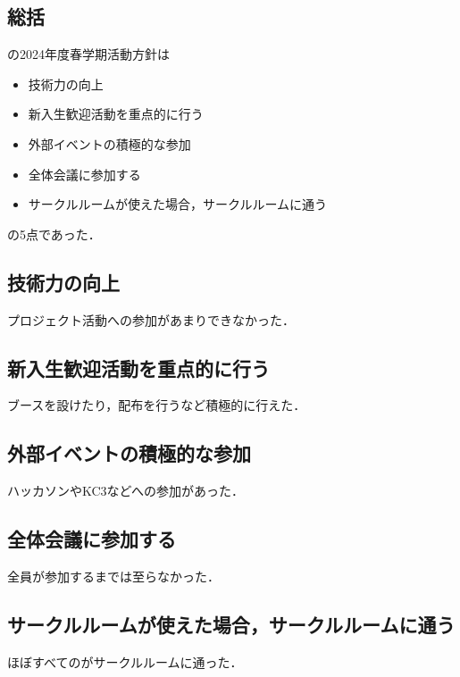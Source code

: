 \subsection*{\secondGrade{}総括}


\secondGrade{}の2024年度春学期活動方針は
\begin{itemize}
    \item 技術力の向上
    \item 新入生歓迎活動を重点的に行う
    \item 外部イベントの積極的な参加
    \item 全体会議に参加する
    \item サークルルームが使えた場合，サークルルームに通う
\end{itemize}
の5点であった．

\subsection*{技術力の向上}
プロジェクト活動への参加があまりできなかった．

\subsection*{新入生歓迎活動を重点的に行う}
ブースを設けたり，配布を行うなど積極的に行えた．

\subsection*{外部イベントの積極的な参加}
ハッカソンやKC3などへの参加があった．

\subsection*{全体会議に参加する}
全員が参加するまでは至らなかった．

\subsection*{サークルルームが使えた場合，サークルルームに通う}
ほぼすべての\secondGrade{}がサークルルームに通った．
